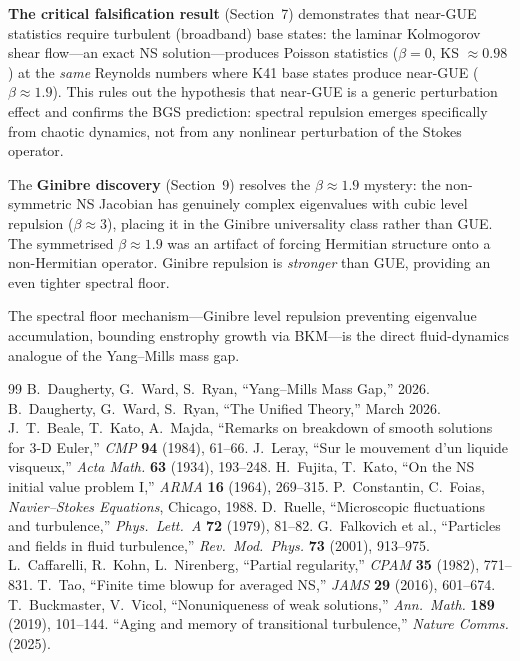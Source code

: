 \documentclass[11pt,a4paper]{article}
\theoremstyle{plain}
\theoremstyle{definition}
\theoremstyle{remark}
\begin{document}
\textbf{The critical falsification result} (Section~7) demonstrates that near-GUE statistics require turbulent (broadband) base states: the laminar Kolmogorov shear flow---an exact NS solution---produces Poisson statistics ($\beta = 0$, KS $\approx 0.98$) at the \emph{same} Reynolds numbers where K41 base states produce near-GUE ($\beta \approx 1.9$). This rules out the hypothesis that near-GUE is a generic perturbation effect and confirms the BGS prediction: spectral repulsion emerges specifically from chaotic dynamics, not from any nonlinear perturbation of the Stokes operator.

The \textbf{Ginibre discovery} (Section~9) resolves the $\beta \approx 1.9$ mystery: the non-symmetric NS Jacobian has genuinely complex eigenvalues with cubic level repulsion ($\beta \approx 3$), placing it in the Ginibre universality class rather than GUE. The symmetrised $\beta \approx 1.9$ was an artifact of forcing Hermitian structure onto a non-Hermitian operator. Ginibre repulsion is \emph{stronger} than GUE, providing an even tighter spectral floor.

The spectral floor mechanism---Ginibre level repulsion preventing eigenvalue accumulation, bounding enstrophy growth via BKM---is the direct fluid-dynamics analogue of the Yang--Mills mass gap.

\begin{thebibliography}{99}
 B.~Daugherty, G.~Ward, S.~Ryan, ``Yang--Mills Mass Gap,'' 2026.
 B.~Daugherty, G.~Ward, S.~Ryan, ``The Unified Theory,'' March 2026.
 J.~T.~Beale, T.~Kato, A.~Majda, ``Remarks on breakdown of smooth solutions for 3-D Euler,'' \textit{CMP} \textbf{94} (1984), 61--66.
 J.~Leray, ``Sur le mouvement d'un liquide visqueux,'' \textit{Acta Math.} \textbf{63} (1934), 193--248.
 H.~Fujita, T.~Kato, ``On the NS initial value problem I,'' \textit{ARMA} \textbf{16} (1964), 269--315.
 P.~Constantin, C.~Foias, \textit{Navier--Stokes Equations}, Chicago, 1988.
 D.~Ruelle, ``Microscopic fluctuations and turbulence,'' \textit{Phys.~Lett.~A} \textbf{72} (1979), 81--82.
 G.~Falkovich et al., ``Particles and fields in fluid turbulence,'' \textit{Rev.~Mod.~Phys.} \textbf{73} (2001), 913--975.
 L.~Caffarelli, R.~Kohn, L.~Nirenberg, ``Partial regularity,'' \textit{CPAM} \textbf{35} (1982), 771--831.
 T.~Tao, ``Finite time blowup for averaged NS,'' \textit{JAMS} \textbf{29} (2016), 601--674.
 T.~Buckmaster, V.~Vicol, ``Nonuniqueness of weak solutions,'' \textit{Ann.~Math.} \textbf{189} (2019), 101--144.
 ``Aging and memory of transitional turbulence,'' \textit{Nature Comms.} (2025).
\end{thebibliography}
\end{document}
